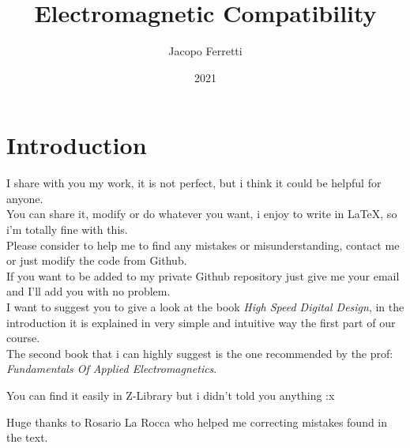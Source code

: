 \documentclass{article}
\title{Electromagnetic Compatibility}
\date{2021}
\author{Jacopo Ferretti}
\numberwithin{equation}{section}
\numberwithin{figure}{section}
\begin{document}
\clearpage\maketitle
\thispagestyle{empty}
\begin{center}
  \Huge{}
\end{center}
\newpage
{}
\tableofcontents
\newpage
\section*{Introduction}
I share with you my work, it is not perfect, but i think it could be helpful for anyone.\\
You can share it, modify or do whatever you want, i enjoy to write in \LaTeX, so i'm totally fine with this.\\
Please consider to help me to find any mistakes or misunderstanding, contact me or just modify the code from Github.\\
If you want to be added to my private Github repository just give me your email and I'll add you with no problem.\\
I want to suggest you to give a look at the book \emph{High Speed Digital Design}\cite{zhang_book}, in the introduction it is explained in very simple and intuitive way the first part of our course.\\
The second book that i can highly suggest is the one recommended by the prof: \emph{Fundamentals Of Applied Electromagnetics}\cite{found_of_applied_magnetism}.
\begin{footnotesize}
You can find it easily in Z-Library but i didn't told you anything :x
\end{footnotesize}
\vspace*{\fill}
Huge thanks to Rosario La Rocca who helped me correcting mistakes found in the text.
\newpage











\medskip


\end{document}

